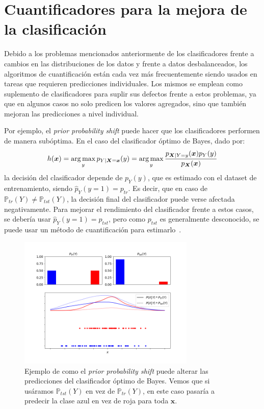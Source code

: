 \section{Cuantificadores para la mejora de la
clasificación}\label{problema:mejora}

Debido a los problemas mencionados anteriormente de los clasificadores frente a
cambios en las distribuciones de los datos y frente a datos desbalanceados, los
algoritmos de cuantificación están cada vez más frecuentemente siendo usados en
tareas que requieren predicciones individuales. Los mismos se emplean como
suplemento de clasificadores para suplir sus defectos frente a estos problemas,
ya que en algunos casos no solo predicen los valores agregados, sino que también
mejoran las predicciones a nivel individual.

Por ejemplo, el {\it prior probability shift\/} puede hacer que los
clasificadores performen de manera subóptima. En el caso del clasificador óptimo
de Bayes, dado por:
\begin{equation}\label{ecuacion:bayes}
    h(\boldsymbol{x}) = \operatorname*{arg\,max}_{y} p_{Y|\boldsymbol{X}=\boldsymbol{x}}(y) = \operatorname*{arg\,max}_{y} \frac{p_{\boldsymbol{X}|Y=y}(\boldsymbol{x})p_Y(y)}{p_{\boldsymbol{X}}(\boldsymbol{x})}
\end{equation}
la decisión del clasificador depende de $p_Y(y)$, que es estimado con el dataset
de entrenamiento, siendo $\hat p_Y(y=1) = p_{tr}$. Es decir, que en caso de
$\mathbb{P}_{tr}(Y) \neq \mathbb{P}_{tst}(Y)$, la decisión final del
clasificador puede verse afectada negativamente. Para mejorar el rendimiento del
clasificador frente a estos casos, se debería usar $\hat p_Y(y=1) = p_{tst}$,
pero como $p_{tst}$ es generalmente desconocido, se puede usar un método de
cuantificación para estimarlo~\cite{saerens2002adjusting, alaiz2011class,
zhang2010transfer, xue2009quantification}.

\begin{figure}[H]
    \centerline{\includegraphics[width=0.75\textwidth]{../plots_teoria/bayes_classifier.png}}
    \caption{Ejemplo de como el {\it prior probability shift\/} puede alterar
    las predicciones del clasificador óptimo de Bayes. Vemos que si usáramos
    $\mathbb{P}_{tst}(Y)$ en vez de $\mathbb{P}_{tr}(Y)$, en este caso pasaría a
    predecir la clase azul en vez de roja para toda
    $\boldsymbol{x}$.}\label{fig:bayes_classifier}
\end{figure}

